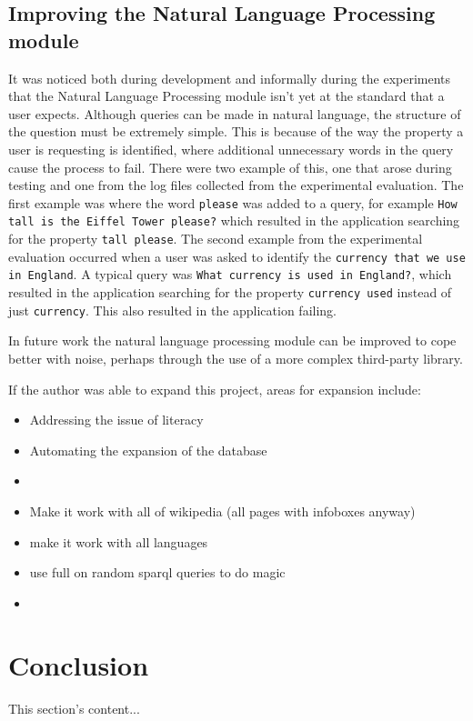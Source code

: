 \documentclass[authoryearcitations]{UoYCSproject}
\begin{document}
\section{Improving the Natural Language Processing module}
\label{sec:evalNlp}
It was noticed both during development and informally during the experiments that the Natural Language Processing module isn't yet at the standard that a user expects. Although queries can be made in natural language, the structure of the question must be extremely simple. This is because of the way the property a user is requesting is identified, where additional unnecessary words in the query cause the process to fail. There were two example of this, one that arose during testing and one from the log files collected from the experimental evaluation. The first example was where the word \texttt{please} was added to a query, for example \texttt{How tall is the Eiffel Tower please?} which resulted in the application searching for the property \texttt{tall please}. The second example from the experimental evaluation occurred when a user was asked to identify the \texttt{currency that we use in England}. A typical query was \texttt{What currency is used in England?}, which resulted in the application searching for the property \texttt{currency used} instead of just \texttt{currency}. This also resulted in the application failing.

In future work the natural language processing module can be improved to cope better with noise, perhaps through the use of a more complex third-party library.


If the author was able to expand this project, areas for expansion include:
\begin{itemize}
  \item Addressing the issue of literacy
  \item Automating the expansion of the database
  \item 
  \item Make it work with all of wikipedia (all pages with infoboxes anyway)
  \item make it work with all languages
  \item use full on random sparql queries to do magic
  \item 
\end{itemize}

\newpage

\chapter{Conclusion}
\label{sec:conclusion}
This section's content...
\end{document}
